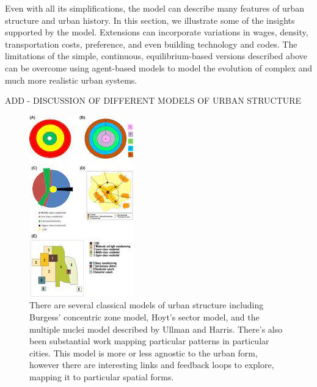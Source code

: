 Even with all its simplifications, the model can describe many features of urban structure and urban history. In this section, we illustrate some of the insights supported by the model. Extensions can incorporate variations in wages, density, transportation costs, preference, and even building technology and codes. The limitations of the simple, continuous, equilibrium-based versions described above can be overcome using agent-based models to model the evolution of complex and much more realistic urban systems. 


ADD - DISCUSSION OF DIFFERENT MODELS OF URBAN STRUCTURE %
\begin{figure}
    \centering
    \includegraphics{fig/urban-structure.jpeg}
    \caption[Classical models of urban structure.]{There are several classical models of urban structure including Burgess' concentric zone model, Hoyt's sector model, and the multiple nuclei model described by Ullman and Harris. There's also been substantial work mapping particular patterns in particular cities. This model is more or less agnostic to the urban form, however there are interesting links and feedback loops to explore, mapping it to particular spatial forms.} %
    \label{fig-urban-structure}
\end{figure}


